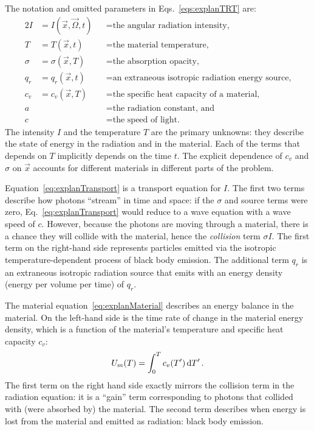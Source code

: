 The notation and omitted parameters in Eqs.~\eqref{eqs:explanTRT} are:
\begin{alignat*}{2}
  I &= I(\vec{x}, \vec{\Omega}, t) &&= \text{the angular
  radiation intensity,}
  \\
  T &= T(\vec{x}, t) &&= \text{the material temperature,}
  \\
  \sigma &= \sigma(\vec{x}, T) &&= \text{the absorption opacity,} 
  \\
  q_r &= q_r(\vec{x}, t) &&= \text{an extraneous isotropic radiation energy source,}
  \\
  c_v &= c_v(\vec{x}, T) &&= \text{the specific heat capacity of a material,}
  \\
  a& &&= \text{the radiation constant, and}
  \\
  c& &&= \text{the speed of light.}
\end{alignat*}
The intensity $I$ and the temperature $T$ are the primary unknowns: they
describe the state of energy in the radiation and in the material.
Each of the terms that depends on $T$ implicitly depends on the time $t$. The
explicit dependence of $c_v$ and $\sigma$ on $\vec{x}$ accounts for different
materials in different parts of the problem.

Equation~\eqref{eq:explanTransport} is a transport equation for $I$. The first
two terms describe how photons ``stream'' in time and space: if the $\sigma$
and source terms were zero, Eq.~\eqref{eq:explanTransport} would reduce to a
wave equation with a wave speed of $c$. However, because the photons are moving
through a material, there is a chance they will collide with the material,
hence the \emph{collision} term $\sigma I$. The first term on the right-hand
side represents particles emitted via the isotropic temperature-dependent
process of black body emission. The additional term $q_r$ is an extraneous
isotropic radiation source that emits with an energy density (energy per
volume per time) of $q_r$.

The material equation~\eqref{eq:explanMaterial} describes an energy balance in
the material. On the left-hand side is the time rate of change in the material
energy density, which is a function of the material's temperature and specific
heat capacity $c_v$:
\begin{equation} \label{eq:matEnergyDens}
  U_m(T) = \int_{0}^{T} c_v(T') \mathop{}\!\mathrm{d} T' \,.
\end{equation}
The first term on the right hand side exactly mirrors the collision term in the
radiation equation: it is a ``gain'' term corresponding to photons that
collided with (were absorbed by) the material. The second term describes when
energy is lost from the material and emitted as radiation: black body emission.

